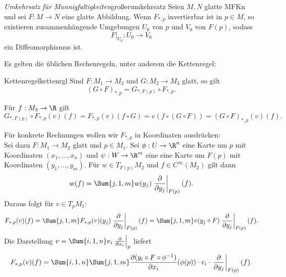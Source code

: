 \begin{theorem}{\textit{Umkehrsatz für Mannigfaltigkeiten}}{großerumkehrsatz}
Seien $M,N$ glatte MFKn und sei $F:M \to N$ eine glatte Abbildung. Wenn $F_{\ast, p}$ invertierbar ist in $p \in M$, so existieren zusammenhängende Umgebungen $U_0$ von $p$ und $V_0$ von $F(p)$, sodass
\begin{equation}
F|_{U_0}: U_0 \to V_0
\end{equation}
ein Diffeomorphismus ist.
\end{theorem}
Es gelten die üblichen Rechenregeln, unter anderem die Kettenregel:
\begin{satz}{Kettenregel}{kettenrgl}
Sind $F: M_1 \to M_2$ und $G: M_2 \to M_3$ glatt, so gilt
\begin{equation}
(G \circ F)_{\ast, p} = G_{\ast, F(p)} \circ F_{\ast, p}.
\end{equation}
\end{satz}
\begin{beweis}
Für $f: M_3 \to \R$ gilt 
\begin{equation}
G_{\ast, F(p)} \circ F_{\ast, p} (v)(f) = F_{\ast, p} (v) (f \circ G) = v(f \circ (G \circ F)) = (G \circ F)_{\ast, p} (v)(f).
\end{equation}
\end{beweis}
Für konkrete Rechnungen wollen wir $F_{\ast, p}$ in Koordinaten ausdrücken:\\
Sei dazu $F: M_1 \to M_2$ glatt und $p \in M_1$. Sei $\phi: U \to \R^n$ eine Karte um $p$ mit Koordinaten $(x_1, \dots, x_n)$ und $\psi: W \to \R^m$ eine eine Karte um $F(p)$ mit Koordinaten $(y_1, \dots, y_m)$. Für $w \in T_{F(p)}M_2$ und $f \in C^\infty(M_2)$ gilt dann 
\begin{equation}
w(f) = \Sum{j,1,m} w(y_j) \left.\frac{\partial}{\partial y_j}\right|_{F(p)}(f).
\end{equation} 
Daraus folgt für $v \in T_pM_1$:
\begin{equation}
F_{\ast, p}(v)(f) = \Sum{j,1,m}F_{\ast, p}(v)(y_j) \left.\frac{\partial}{\partial y_j}\right|_{F(p)}(f) = \Sum{j,1,m} v(y_j \circ F) \left.\frac{\partial}{\partial y_j}\right|_{F(p)}(f).
\end{equation}
Die Darstellung $v = \Sum{i,1,n} v_i \left.\frac{\partial}{\partial x_i}\right|_{p}$ liefert
\begin{equation}
F_{\ast, p}(v)(f) = \Sum{i,1,n}\Sum{j,1,m} \frac{\partial (y_i \circ F \circ \phi^{-1})}{\partial x_i} (\phi(p)) \cdot v_i \cdot \left.\frac{\partial}{\partial y_j}\right|_{F(p)}(f).
\end{equation}
